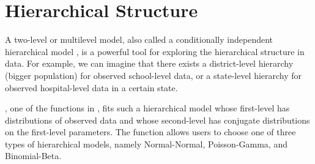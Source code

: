 \documentclass[article]{jss}
\begin{document}

\section[Hierarchical Structure]{Hierarchical Structure} \label{hierarchical}
A two-level or multilevel model, also called a conditionally independent hierarchical model \citep{1989}, is a powerful tool for exploring the hierarchical structure in data. For example, we can imagine that there exists a district-level hierarchy (bigger population) for observed school-level data, or a state-level hierarchy for observed hospital-level data in a certain state. 

, one of the functions in , fits such a hierarchical model whose first-level has distributions of observed data and whose second-level has conjugate distributions on the first-level parameters. The  function allows users to choose one of three types of hierarchical models, namely Normal-Normal, Poisson-Gamma, and Binomial-Beta. 
 
\end{document}
